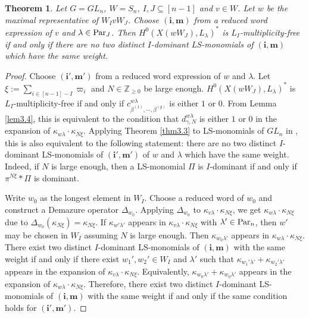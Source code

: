 \documentclass[12pt]{amsart}
\newtheorem{theorem}{Theorem}[section]
\theoremstyle{definition}
\theoremstyle{remark}
\newcommand{\Z}{\mathbb{Z}}
\newcommand{\Parn}{{\rm Par}_n}
\newcommand{\Parj}{{\rm Par}_J}
\begin{document}
\begin{theorem}\label{thm4.1}
Let $G=GL_n$, $W=S_n$, $I , J \subseteq [n-1]$ and $v \in W$. Let $w$ be the maximal representative of $W_I v W_J$. Choose $( \mathbf{i}, \mathbf{m})$ from a reduced word expression of $v$ and $\lambda \in \Parj$. Then $H^0(X(wW_J),L_\lambda)^*$ is $L_I$-multiplicity-free if and only if there are no two distinct $I$-dominant LS-monomials of $(\mathbf{i}, \mathbf{m})$ which have the same weight.
\end{theorem}
\begin{proof}
Choose $(\mathbf{i'}, \mathbf{m'})$ from a reduced word expression of $w$ and $\lambda$. Let $\xi := \sum_{i \in [n-1]- I} \varpi_i$ and $N \in \Z_{\geq 0}$ be large enough. $H^0(X(wW_J) , L_\lambda)^*$ is $L_I$-multiplicity-free if and only if $c_{\beta^{(1)} , \cdots , \beta^{(g)}}^{w \lambda}$ is either $1$ or $0$. From Lemma \ref{lem3.4}, this is equivalent to the condition that $d_{\gamma , N}^{w\lambda}$ is either $1$ or $0$ in the expansion of $\kappa_{w\lambda} \cdot \kappa_{N \xi}$. Applying Theorem \ref{thm3.3} to LS-monomials of $GL_n$ in \citep{MR1644050}, this is also equivalent to the following statement: there are no two distinct $I$-dominant LS-monomials of $(\mathbf{i'}, \mathbf{m'})$ of $w$ and $\lambda$ which have the same weight. Indeed, if $N$ is large enough, then a LS-monomial $\Pi$ is $I$-dominant if and only if $\pi^{N\xi} * \Pi$ is dominant.

Write $w_0$ as the longest element in $W_I$. Choose a reduced word of $w_0$ and construct a Demazure operator $\Delta_{w_0}$. Applying $\Delta_{w_0}$ to $\kappa_{v \lambda} \cdot \kappa_{N \xi}$, we get $\kappa_{w \lambda} \cdot \kappa_{N \xi}$ due to $\Delta_{w_0} (\kappa_{N\xi}) = \kappa_{N \xi}$. If $\kappa_{w' \lambda'}$ appears in $\kappa_{v \lambda} \cdot \kappa_{N\xi}$ with $\lambda' \in \Parn$, then $w'$ may be chosen in $W_I$ assuming $N$ is large enough. Then $\kappa_{w_0 \lambda'}$ appears in $\kappa_{w \lambda} \cdot \kappa_{N\xi}$. There exist two distinct $I$-dominant LS-monomials of $(\mathbf{i} , \mathbf{m})$ with the same weight if and only if there exist $w_{1}' , w_2' \in W_I$ and $\lambda'$ such that $\kappa_{w_1' \lambda'} + \kappa_{w_2' \lambda'}$ appears in the expansion of $\kappa_{v \lambda} \cdot \kappa_{N\xi}$. Equivalently, $\kappa_{w_0 \lambda'} + \kappa_{w_0 \lambda'}$ appears in the expansion of $\kappa_{w \lambda} \cdot \kappa_{N \xi}$. Therefore, there exist two distinct $I$-dominant LS-monomials of $(\mathbf{i}, \mathbf{m})$ with the same weight if and only if the same condition holds for $(\mathbf{i'}, \mathbf{m'})$.
\end{proof}
\end{document}
